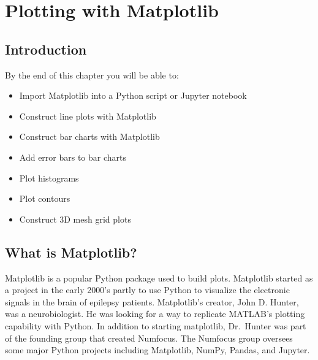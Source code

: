 \documentclass{book}
\begin{document}
    
        \chapter{Plotting with Matplotlib}\label{plotting-with-matplotlib}
    




    
        \section{Introduction}\label{introduction}
    




    
        By the end of this chapter you will be able to:

\begin{itemize}
\item
  Import Matplotlib into a Python script or Jupyter notebook
\item
  Construct line plots with Matplotlib
\item
  Construct bar charts with Matplotlib
\item
  Add error bars to bar charts
\item
  Plot histograms
\item
  Plot contours
\item
  Construct 3D mesh grid plots
\end{itemize}
        \newpage



    




    
        \section{What is Matplotlib?}\label{what-is-matplotlib}
    




    
        Matplotlib is a popular Python package used to build plots. Matplotlib
started as a project in the early 2000's partly to use Python to
visualize the electronic signals in the brain of epilepsy patients.
Matplotlib's creator, John D. Hunter, was a neurobiologist. He was
looking for a way to replicate MATLAB's plotting capability with Python.
In addition to starting matplotlib, Dr.~Hunter was part of the founding
group that created Numfocus. The Numfocus group oversees some major
Python projects including Matplotlib, NumPy, Pandas, and Jupyter.
    
\end{document}
